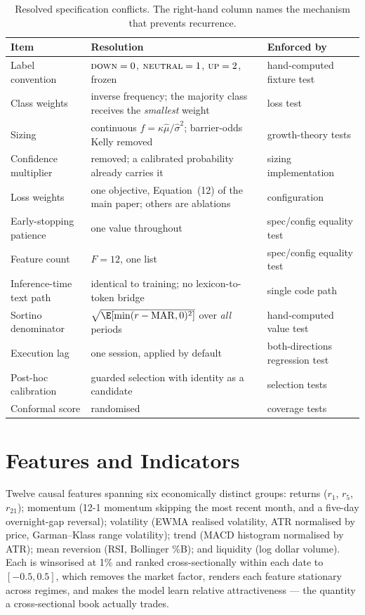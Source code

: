 \documentclass[10pt,a4paper]{article}
\newcommand{\Down}{\textsc{down}}
\newcommand{\Neutral}{\textsc{neutral}}
\newcommand{\Up}{\textsc{up}}
\newcommand{\muhat}{\hat{\mu}}
\newcommand{\sigmahat}{\hat{\sigma}}
\begin{document}
\begin{table}[t]
\centering
\caption{Resolved specification conflicts. The right-hand column names the
mechanism that prevents recurrence.}
\label{tab:supersede}
\small
\begin{tabular}{p{4.1cm}p{6.4cm}p{3.6cm}}
\toprule
\textbf{Item} & \textbf{Resolution} & \textbf{Enforced by}\\
\midrule
Label convention & $\Down=0$, $\Neutral=1$, $\Up=2$, frozen &
  hand-computed fixture test\\
Class weights & inverse frequency; the majority class receives the
  \emph{smallest} weight & loss test\\
Sizing & continuous $f=\kappa\muhat/\sigmahat^{2}$; barrier-odds Kelly removed &
  growth-theory tests\\
Confidence multiplier & removed; a calibrated probability already carries it &
  sizing implementation\\
Loss weights & one objective, Equation~(12) of the main paper; others are
  ablations & configuration\\
Early-stopping patience & one value throughout & spec/config equality test\\
Feature count & $F=12$, one list & spec/config equality test\\
Inference-time text path & identical to training; no lexicon-to-token bridge &
  single code path\\
Sortino denominator & $\sqrt{\E[\min(r-\mathrm{MAR},0)^{2}]}$ over \emph{all}
  periods & hand-computed value test\\
Execution lag & one session, applied by default & both-directions regression
  test\\
Post-hoc calibration & guarded selection with identity as a candidate &
  selection tests\\
Conformal score & randomised & coverage tests\\
\bottomrule
\end{tabular}
\end{table}


\section{Features and Indicators}
\label{app:features}

Twelve causal features spanning six economically distinct groups: returns
($r_1$, $r_5$, $r_{21}$); momentum (12-1 momentum skipping the most recent
month, and a five-day overnight-gap reversal); volatility (EWMA realised
volatility, ATR normalised by price, Garman--Klass range volatility); trend
(MACD histogram normalised by ATR); mean reversion (RSI, Bollinger \%B); and
liquidity (log dollar volume). Each is winsorised at 1\% and ranked
cross-sectionally within each date to $[-0.5,0.5]$, which removes the market
factor, renders each feature stationary across regimes, and makes the model
learn relative attractiveness --- the quantity a cross-sectional book actually
trades.
\end{document}
